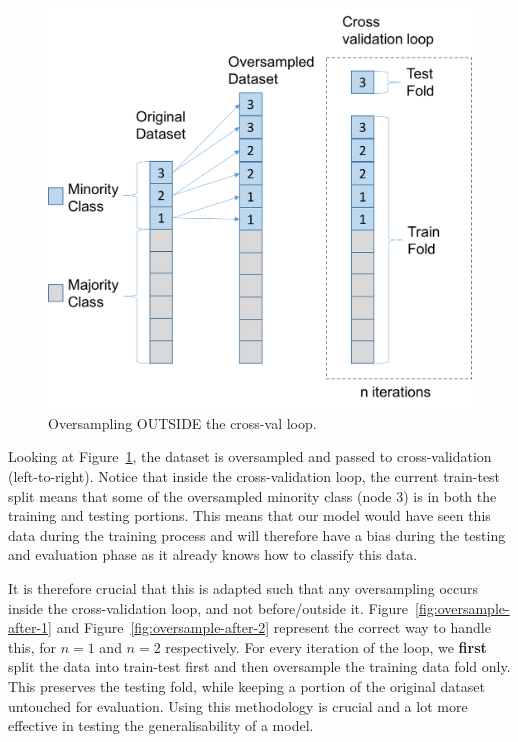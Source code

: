 \documentclass[12pt,a4paper,twoside]{report}
\begin{document}
\begin{figure}[H]
\centering
\includegraphics[scale=0.8]{oversample-before}
\caption{Oversampling OUTSIDE the cross-val loop.}
\label{fig:oversample-before}
\end{figure}

Looking at Figure~\ref{fig:oversample-before}, the dataset is oversampled and passed to cross-validation (left-to-right). Notice that inside the cross-validation loop, the current train-test split means that some of the oversampled minority class (node 3) is in both the training and testing portions. This means that our model would have seen this data during the training process and will therefore have a bias during the testing and evaluation phase as it already knows how to classify this data. 

It is therefore crucial that this is adapted such that any oversampling occurs inside the cross-validation loop, and not before/outside it. Figure~\ref{fig:oversample-after-1} and Figure~\ref{fig:oversample-after-2} represent the correct way to handle this, for $n=1$ and $n=2$ respectively. For every iteration of the loop, we \textbf{first} split the data into train-test first and then oversample the training data fold only. This preserves the testing fold, while keeping a portion of the original dataset untouched for evaluation. Using this methodology is crucial and a lot more effective in testing the generalisability of a model.
\end{document}
